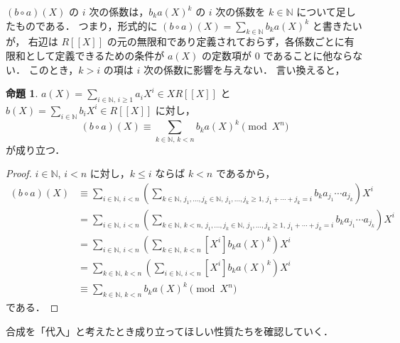 \documentclass{jsarticle}
\newcommand{\N}{\mathbb{N}}
\theoremstyle{definition}
\newtheorem{Prp}{命題}
\newenvironment{prp}{\vspace{1ex}\begin{screen}\begin{Prp}}{\end{Prp}\end{screen}}
\newenvironment{prf}{\begin{leftbar}\begin{proof}}{\end{proof}\end{leftbar}}
\begin{document}
$(b \circ a)(X)$ の $i$ 次の係数は，$b_k a(X)^k$ の $i$ 次の係数を $k \in \N$ について足したものである．
つまり，形式的に $(b \circ a)(X) = \sum_{k\in\N} b_k a(X)^k$ と書きたいが，
右辺は $R[[X]]$ の元の無限和であり定義されておらず，各係数ごとに有限和として定義できるための条件が $a(X)$ の定数項が $0$ であることに他ならない．
このとき，$k > i$ の項は $i$ 次の係数に影響を与えない．
言い換えると，
\begin{prp}
  \label{prp:composition-mod}
  $a(X) = \sum_{i\in\N,\,i\ge 1} a_i X^i \in X R[[X]]$ と
  $b(X) = \sum_{i\in\N} b_i X^i \in R[[X]]$ に対し，
  \[
    (b \circ a)(X) \equiv \sum_{k\in\N,\,k<n} b_k a(X)^k \pmod{X^n}
  \]
  が成り立つ．
\end{prp}
\begin{prf}
  $i \in \N$, $i < n$ に対し，$k \le i$ ならば $k < n$ であるから，
  \begin{align*}
    (b \circ a)(X)
    &\equiv \sum_{i\in\N,\,i<n} \left(\sum_{k\in\N,\, j_1,\ldots,j_k\in\N,\, j_1,\ldots,j_k\ge 1,\, j_1+\cdots+j_k=i} b_k a_{j_1} \cdots a_{j_k} \right) X^i \\
    &= \sum_{i\in\N,\,i<n} \left(\sum_{k\in\N,\, k<n,\, j_1,\ldots,j_k\in\N,\, j_1,\ldots,j_k\ge 1,\, j_1+\cdots+j_k=i} b_k a_{j_1} \cdots a_{j_k} \right) X^i \\
    &= \sum_{i\in\N,\,i<n} \left( \sum_{k\in\N,\,k<n} [X^i] b_k a(X)^k \right) X^i \\
    &= \sum_{k\in\N,\,k<n} \left( \sum_{i\in\N,\,i<n} [X^i] b_k a(X)^k \right) X^i \\
    &\equiv \sum_{k\in\N,\,k<n} b_k a(X)^k \pmod{X^n}
  \end{align*}
  である．
\end{prf}

合成を「代入」と考えたとき成り立ってほしい性質たちを確認していく．
\end{document}
